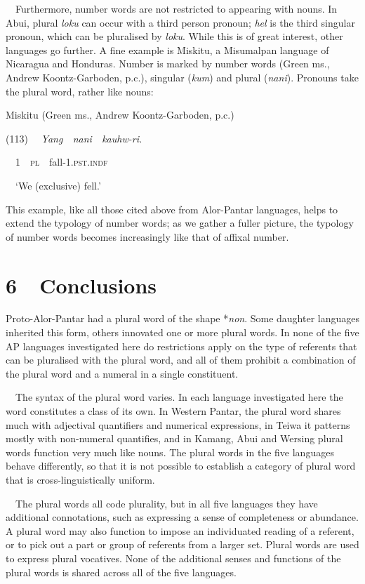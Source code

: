\ \ Furthermore, number words are not restricted to appearing with nouns. In Abui, plural \textit{loku }can occur with a third person pronoun; \textit{hel }is the third singular pronoun, which can be pluralised by \textit{loku}. While this is of great interest, other languages go further. A fine example is Miskitu, a Misumalpan language of Nicaragua and Honduras. Number is marked by number words (Green ms., Andrew Koontz-Garboden, p.c.), singular (\textit{kum}) and plural (\textit{nani}). Pronouns take the plural word, rather like nouns: 

Miskitu (Green ms., Andrew Koontz-Garboden, p.c.)

(113) \ \ \textit{Yang\ \ nani\ \ kauhw-ri.}

\ \ 1\ \ \textsc{pl}\ \ fall-1.\textsc{pst.indf}

\ \ {\textquoteleft}We (exclusive) fell.{\textquoteright}

This example, like all those cited above from Alor-Pantar languages, helps to extend the typology of number words; as we gather a fuller picture, the typology of number words becomes increasingly like that of affixal number.

\clearpage\section[6\ \ Conclusions]{6\ \ Conclusions}
Proto-Alor-Pantar had a plural word of the shape *\textit{non}. Some daughter languages inherited this form, others innovated one or more plural words. In none of the five AP languages investigated here do restrictions apply on the type of referents that can be pluralised with the plural word, and all of them prohibit a combination of the plural word and a numeral in a single constituent. 

\ \ The syntax of the plural word varies. In each language investigated here the word constitutes a class of its own. In Western Pantar, the plural word shares much with adjectival quantifiers and numerical expressions, in Teiwa it patterns mostly with non-numeral quantifies, and in Kamang, Abui and Wersing plural words function very much like nouns. The plural words in the five languages behave differently, so that it is not possible to establish a category of plural word that is cross-linguistically uniform.

\ \ The plural words all code plurality, but in all five languages they have additional connotations, such as expressing a sense of completeness or abundance. A plural word may also function to impose an individuated reading of a referent, or to pick out a part or group of referents from a larger set. Plural words are used to express plural vocatives. None of the additional senses and functions of the plural words is shared across all of the five languages. 


